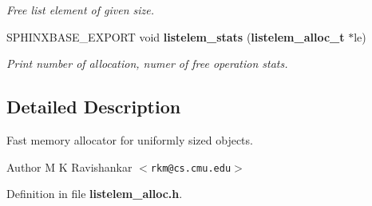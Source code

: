 \begin{DoxyCompactItemize}
\begin{DoxyCompactList}\small\item\em \-Free list element of given size. \end{DoxyCompactList}\item 
\-S\-P\-H\-I\-N\-X\-B\-A\-S\-E\-\_\-\-E\-X\-P\-O\-R\-T void {\bf listelem\-\_\-stats} ({\bf listelem\-\_\-alloc\-\_\-t} $\ast$le)\label{listelem__alloc_8h_a838d9361ba76a89a834a7ea6a185b57d}

\begin{DoxyCompactList}\small\item\em \-Print number of allocation, numer of free operation stats. \end{DoxyCompactList}\end{DoxyCompactItemize}


\subsection{\-Detailed \-Description}
\-Fast memory allocator for uniformly sized objects. \begin{DoxyAuthor}{\-Author}
\-M \-K \-Ravishankar $<${\tt rkm@cs.\-cmu.\-edu}$>$ 
\end{DoxyAuthor}


\-Definition in file {\bf listelem\-\_\-alloc.\-h}.


